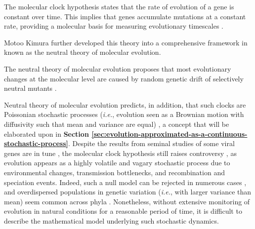 \begin{definition}
    The molecular clock hypothesis states that the rate of evolution of a gene is constant over time. This implies that genes accumulate mutations at a constant rate, providing a molecular basis for measuring evolutionary timescales \cite{zuckerkandl1965,ayala1999,kumar2005}.
\end{definition}

Motoo Kimura further developed this theory into a comprehensive framework in known as the neutral theory of molecular evolution.

\begin{definition}
    The neutral theory of molecular evolution proposes that most evolutionary changes at the molecular level are caused by random genetic drift of selectively neutral mutants \cite{kimura1968,kimura1987}.
\end{definition}

Neutral theory of molecular evolution predicts, in addition, that such clocks are Poissonian stochastic processes (\textit{i.e.}, evolution seen as a Brownian motion with diffusivity such that mean and variance are equal) \cite{kimura1987}, a concept that will be elaborated upon in \textbf{Section \ref{sec:evolution-approximated-as-a-continuous-stochastic-process}}. Despite the results from seminal studies of some viral genes are in tune \cite{gojobori1990,leitner1999}, the molecular clock hypothesis still raises controversy \cite{kumar2005}, as evolution appears as a highly volatile and vagary stochastic process due to environmental changes, transmission bottlenecks, and recombination and speciation events. Indeed, such a null model can be rejected in numerous cases \cite{jenkins2002}, and overdispersed populations in genetic variation (\textit{i.e.}, with larger variance than mean) seem common across phyla \cite{bedford2008}. Nonetheless, without extensive monitoring of evolution in natural conditions for a reasonable period of time, it is difficult to describe the mathematical model underlying such stochastic dynamics.

